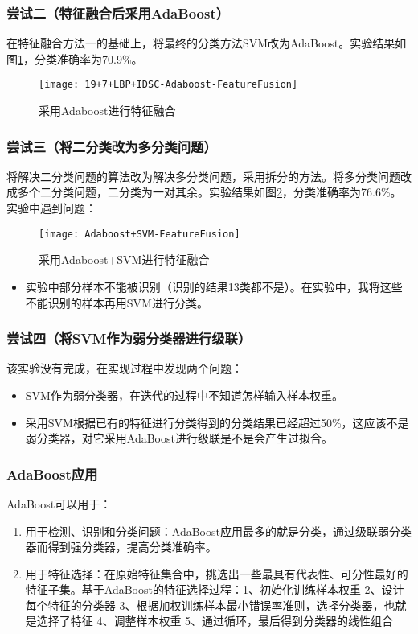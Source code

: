 \subsubsection{尝试二（特征融合后采用AdaBoost）}
在特征融合方法一的基础上，将最终的分类方法SVM改为AdaBoost。实验结果如图\ref{fig:19+7+LBP+IDSC-Adaboost-FeatureFusion}，分类准确率为70.9\%。
\begin{figure}[!ht]
\centering
\texttt{[image: 19+7+LBP+IDSC-Adaboost-FeatureFusion]}
\caption{采用Adaboost进行特征融合}
\label{fig:19+7+LBP+IDSC-Adaboost-FeatureFusion}
\end{figure}

\subsubsection{尝试三（将二分类改为多分类问题）}
将解决二分类问题的算法改为解决多分类问题，采用拆分的方法。将多分类问题改成多个二分类问题，二分类为一对其余。实验结果如图\ref{fig:Adaboost+SVM-FeatureFusion}，分类准确率为76.6\%。实验中遇到问题：
\begin{figure}[!ht]
\centering
\texttt{[image: Adaboost+SVM-FeatureFusion]}
\caption{采用Adaboost+SVM进行特征融合}
\label{fig:Adaboost+SVM-FeatureFusion}
\end{figure}
\begin{itemize}
\item 实验中部分样本不能被识别（识别的结果13类都不是）。在实验中，我将这些不能识别的样本再用SVM进行分类。
\end{itemize}

\subsubsection{尝试四（将SVM作为弱分类器进行级联）}
该实验没有完成，在实现过程中发现两个问题：
\begin{itemize}
\item SVM作为弱分类器，在迭代的过程中不知道怎样输入样本权重。
\item 采用SVM根据已有的特征进行分类得到的分类结果已经超过50\%，这应该不是弱分类器，对它采用AdaBoost进行级联是不是会产生过拟合。
\end{itemize}



\subsubsection{AdaBoost应用}
AdaBoost可以用于：
\begin{enumerate}
\item 用于检测、识别和分类问题：AdaBoost应用最多的就是分类，通过级联弱分类器而得到强分类器，提高分类准确率。
\item 用于特征选择：在原始特征集合中，挑选出一些最具有代表性、可分性最好的特征子集。基于AdaBoost的特征选择过程：1、初始化训练样本权重 2、设计每个特征的分类器 3、根据加权训练样本最小错误率准则，选择分类器，也就是选择了特征 4、调整样本权重 5、通过循环，最后得到分类器的线性组合
\end{enumerate}


